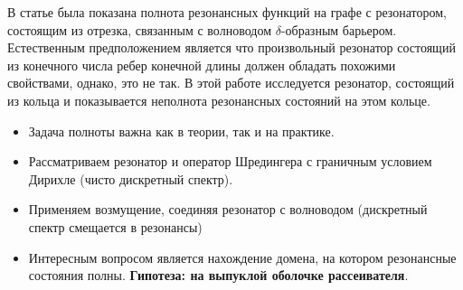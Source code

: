\startprefacepage


В статье \cite{popov_exner70} была показана полнота резонансных функций на графе с резонатором, состоящим из отрезка, связанным с волноводом $\delta$-образным барьером. Естественным предположением является что произвольный резонатор состоящий из конечного числа ребер конечной длины должен обладать похожими свойствами, однако, это не так. В этой работе исследуется резонатор, состоящий из кольца и показывается неполнота резонансных состояний на этом кольце.


\begin{itemize}
\item Задача полноты важна как в теории, так и на практике.

\item Рассматриваем резонатор и оператор Шредингера с граничным условием Дирихле (чисто дискретный спектр).

\item Применяем возмущение, соединяя резонатор с волноводом (дискретный спектр смещается в резонансы)

\item Интересным вопросом является нахождение домена, на котором резонансные состояния полны. \textbf{Гипотеза: на выпуклой оболочке рассеивателя}.
\end{itemize}

